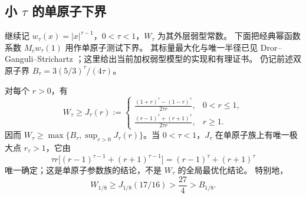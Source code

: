 \subsection{小 \texorpdfstring{$\tau$}{tau} 的单原子下界}

继续记 $w_\tau(x)=|x|^{\tau-1}$，$0<\tau<1$，$W_\tau$ 为其外层弱型常数。
下面把经典幂函数系数 $M_cw_\tau(1)$ 用作单原子测试下界。
其标量最大化与唯一半径已见 Dror--Ganguli--Strichartz
\cite[Lemma~3.3, (3.8)]{DrorGanguliStrichartz1996}；这里给出当前加权弱型模型的实现和有理证书。
仍记前述双原子界 $B_\tau=3(5/3)^\tau/(4\tau)$。

\begin{theorem}[单原子测试与显式下界]
\label{thm:single-atom-small-tau}
对每个 $r>0$，有
\[
 W_\tau\ge J_\tau(r):=
 \begin{cases}
 \displaystyle\frac{(1+r)^\tau-(1-r)^\tau}{2\tau r},&0<r\le1,\\[6pt]
 \displaystyle\frac{(r-1)^\tau+(r+1)^\tau}{2\tau r},&r\ge1.
 \end{cases} \tag{TA.1}
\]
因而 $W_\tau\ge\max\{B_\tau,\sup_{r>0}J_\tau(r)\}$。当
$0<\tau<1$，$J_\tau$ 在单原子族上有唯一极大点 $r_\tau>1$，它由
\[
 \tau r\bigl[(r-1)^{\tau-1}+(r+1)^{\tau-1}\bigr]
 =(r-1)^\tau+(r+1)^\tau \tag{TA.2}
\]
唯一确定；这是单原子参数族的结论，不是 $W_\tau$ 的全局最优化结论。
特别地，
\[
 W_{1/8}\ge J_{1/8}(17/16)>\frac{27}{4}>B_{1/8}. \tag{TA.3}
\]
\end{theorem}

